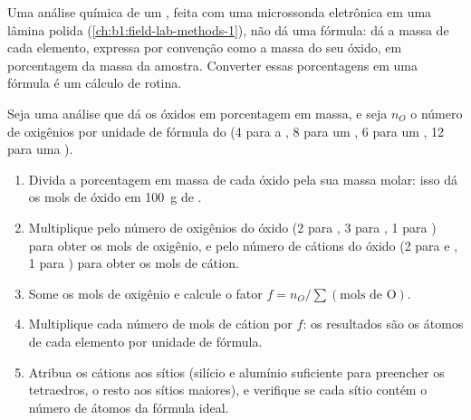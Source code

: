 Uma análise química de um , feita com uma microssonda eletrônica em uma lâmina polida (\cref{ch:b1:field-lab-methods-1}), não dá uma fórmula: dá a massa de cada elemento, expressa por convenção como a massa do seu óxido, em porcentagem da massa da amostra. Converter essas porcentagens em uma fórmula é um cálculo de rotina.

\begin{method}\label{met:b1:rock-forming-minerals:recalculation}
Seja uma análise que dá os óxidos em porcentagem em massa, e seja $n_O$ o número de oxigênios por unidade de fórmula do  (4 para a , 8 para um , 6 para um , 12 para uma ).
\begin{enumerate}
  \item Divida a porcentagem em massa de cada óxido pela sua massa molar: isso dá os mols de óxido em \qty{100}{g} de .
  \item Multiplique pelo número de oxigênios do óxido (2 para , 3 para , 1 para ) para obter os mols de oxigênio, e pelo número de cátions do óxido (2 para  e , 1 para ) para obter os mols de cátion.
  \item Some os mols de oxigênio e calcule o fator
        $f = n_O / \sum(\text{mols de O})$.
  \item Multiplique cada número de mols de cátion por $f$: os resultados são os átomos de cada elemento por unidade de fórmula.
  \item Atribua os cátions aos sítios (silício e alumínio suficiente para preencher os tetraedros, o resto aos sítios maiores), e verifique se cada sítio contém o número de átomos da fórmula ideal.
\end{enumerate}
\end{method}

